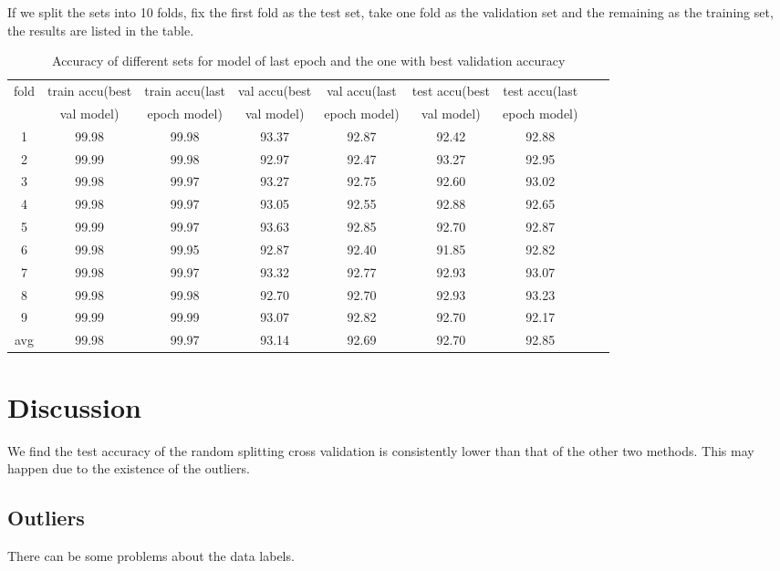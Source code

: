 If we split the sets into 10 folds, fix the first fold as the test set, take one fold as the validation set and the remaining as the training set, the results are listed in the table.
\begin{table}[!htbp]
	\centering
	\caption{Accuracy of different sets for model of last epoch and the one with best validation accuracy }
	\label{table:cv1}
	\begin{tabular}{|c|c|c|c|c|c|c|c|c|}
		\hline
%		
fold	&	train accu(best	&	train accu(last	&	val accu(best	&	val accu(last	&	test accu(best 	&	test accu(last	\\
	&	 val model)	&	 epoch model)	&	val model)	&	 epoch model)	&	val model)	&	 epoch model)	\\\hline
1	&	99.98	&	99.98	&	93.37	&	92.87	&	92.42	&	92.88	\\\hline
2	&	99.99	&	99.98	&	92.97	&	92.47	&	93.27	&	92.95	\\\hline
3	&	99.98	&	99.97	&	93.27	&	92.75	&	92.60	&	93.02	\\\hline
4	&	99.98	&	99.97	&	93.05	&	92.55	&	92.88	&	92.65	\\\hline
5	&	99.99	&	99.97	&	93.63	&	92.85	&	92.70	&	92.87	\\\hline
6	&	99.98	&	99.95	&	92.87	&	92.40	&	91.85	&	92.82	\\\hline
7	&	99.98	&	99.97	&	93.32	&	92.77	&	92.93	&	93.07	\\\hline
8	&	99.98	&	99.98	&	92.70	&	92.70	&	92.93	&	93.23	\\\hline
9	&	99.99	&	99.99	&	93.07	&	92.82	&	92.70	&	92.17	\\\hline
avg	&	99.98	&	99.97	&	93.14	&	92.69	&	92.70	&	92.85	\\\hline
	\end{tabular}
\end{table}

\newpage
\section{Discussion}
We find the test accuracy of the random splitting cross validation is consistently lower than that of the other two methods. This may happen due to the existence of the outliers.

\subsection{Outliers}
There can be some problems about the data labels.

